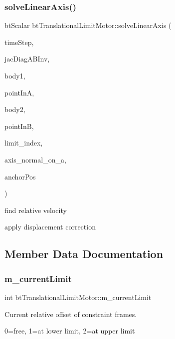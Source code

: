\subsubsection{\texorpdfstring{solve\+Linear\+Axis()}{solveLinearAxis()}}
{\footnotesize\ttfamily bt\+Scalar bt\+Translational\+Limit\+Motor\+::solve\+Linear\+Axis (\begin{DoxyParamCaption}\item[{bt\+Scalar}]{time\+Step,  }\item[{bt\+Scalar}]{jac\+Diag\+A\+B\+Inv,  }\item[{\hyperlink{classbtRigidBody}{bt\+Rigid\+Body} \&}]{body1,  }\item[{const bt\+Vector3 \&}]{point\+InA,  }\item[{\hyperlink{classbtRigidBody}{bt\+Rigid\+Body} \&}]{body2,  }\item[{const bt\+Vector3 \&}]{point\+InB,  }\item[{int}]{limit\+\_\+index,  }\item[{const bt\+Vector3 \&}]{axis\+\_\+normal\+\_\+on\+\_\+a,  }\item[{const bt\+Vector3 \&}]{anchor\+Pos }\end{DoxyParamCaption})}

find relative velocity

apply displacement correction 

\subsection{Member Data Documentation}
\mbox{\label{classbtTranslationalLimitMotor_a1448906baeca79c22f3f9217ab5db120}} 
\subsubsection{\texorpdfstring{m\+\_\+current\+Limit}{m\_currentLimit}}
{\footnotesize\ttfamily int bt\+Translational\+Limit\+Motor\+::m\+\_\+current\+Limit}



Current relative offset of constraint frames. 

0=free, 1=at lower limit, 2=at upper limit \mbox{\label{classbtTranslationalLimitMotor_aa557a6c4d83ca5cb5a942f8f4b236f74}} 

